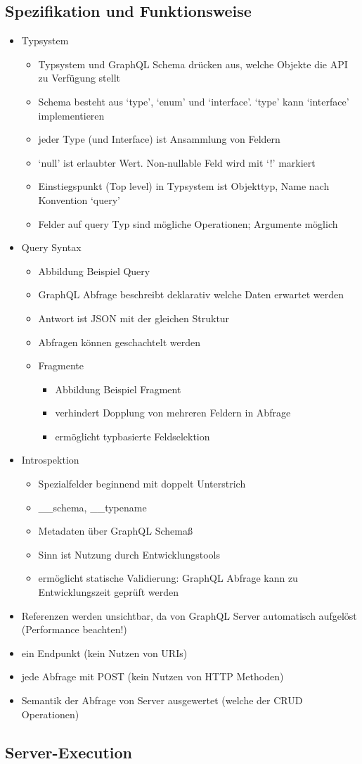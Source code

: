 \subsection{Spezifikation und Funktionsweise}
\begin{itemize}
  \item Typsystem
  \begin{itemize}
    \item Typsystem und GraphQL Schema drücken aus, welche Objekte die API zu Verfügung stellt
    \item Schema besteht aus `type', `enum' und `interface'. `type' kann `interface' implementieren
    \item jeder Type (und Interface) ist Ansammlung von Feldern
    \item `null' ist erlaubter Wert. Non-nullable Feld wird mit `!' markiert
    \item Einstiegspunkt (Top level) in Typsystem ist Objekttyp, Name nach Konvention `query'
    \item Felder auf query Typ sind mögliche Operationen; Argumente möglich
  \end{itemize}
  \item Query Syntax
  \begin{itemize}
    \item Abbildung Beispiel Query
    \item GraphQL Abfrage beschreibt deklarativ welche Daten erwartet werden
    \item Antwort ist JSON mit der gleichen Struktur
    \item Abfragen können geschachtelt werden
    \item Fragmente
    \begin{itemize}
      \item Abbildung Beispiel Fragment
      \item verhindert Dopplung von mehreren Feldern in Abfrage
      \item ermöglicht typbasierte Feldselektion
    \end{itemize}
  \end{itemize}
  \item Introspektion
  \begin{itemize}
    \item Spezialfelder beginnend mit doppelt Unterstrich
    \item \_\_schema, \_\_typename
    \item Metadaten über GraphQL Schemaß
    \item Sinn ist Nutzung durch Entwicklungstools
    \item ermöglicht statische Validierung: GraphQL Abfrage kann zu Entwicklungszeit geprüft werden
  \end{itemize}
  \item Referenzen werden unsichtbar, da von GraphQL Server automatisch aufgelöst (Performance beachten!)
  \item ein Endpunkt (kein Nutzen von URIs)
  \item jede Abfrage mit POST (kein Nutzen von HTTP Methoden)
  \item Semantik der Abfrage von Server ausgewertet (welche der CRUD Operationen)
\end{itemize}

\subsection{Server-Execution}
